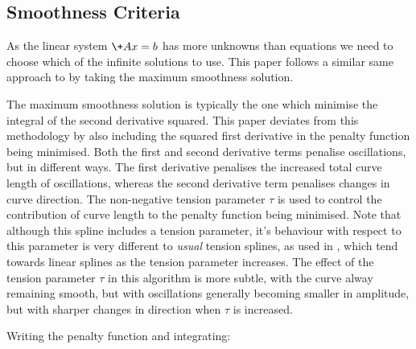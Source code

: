 \documentclass{article}
\begin{document}
\subsection{Smoothness Criteria}
As the linear system $\+{Ax = b}$ has more unknowns than equations we need to choose which of the infinite solutions
to use. This paper follows a similar same approach to \cite{Benth} by taking the maximum smoothness solution.

The maximum smoothness solution is typically the one which minimise the integral of the second derivative squared. This paper deviates from
this methodology by also including the squared first derivative in the penalty function being
minimised. Both the first and second derivative terms penalise oscillations, but in different
ways. The first derivative penalises the increased total curve length of oscillations, whereas the second
derivative term penalises changes in curve direction. The non-negative tension parameter 
$\tau$ is used to control the contribution of curve length to the penalty function being minimised.
Note that although this spline includes a tension parameter, it's behaviour with respect to this
parameter is very different to \emph{usual} tension splines, as used in \cite{Fowler}, which tend towards linear splines
as the tension parameter increases. The effect of the tension parameter $\tau$ in this 
algorithm is more subtle, with the curve alway remaining smooth, but with oscillations generally
becoming smaller in amplitude, but with sharper changes in direction when $\tau$ is increased.

\bigskip

Writing the penalty function and integrating:
\end{document}
